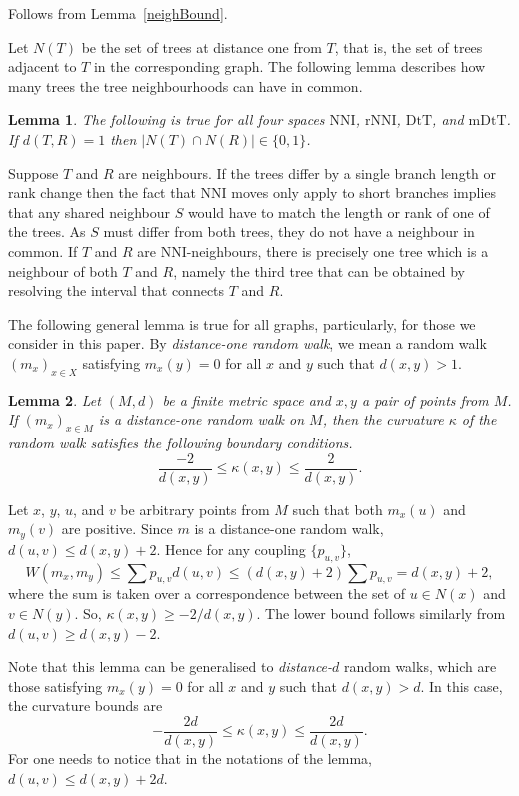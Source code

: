 \documentclass{amsart}
\newtheorem{lemma}{Lemma}
\newcommand{\dts}{\mathrm{DtT}}
\newcommand{\nni}{\mathrm{NNI}}
\newcommand{\rnni}{\mathrm{rNNI}}
\newcommand{\mdts}{\mathrm{mDtT}}
\begin{document}
\proof
Follows from Lemma~\ref{neighBound}.
\endproof

Let $N(T)$ be the set of trees at distance one from $T$, that is, the set of trees adjacent to $T$ in the corresponding graph.
The following lemma describes how many trees the tree neighbourhoods can have in common.

\begin{lemma}\label{intersecNeighb}
The following is true for all four spaces $\nni$, $\rnni$, $\dts$, and $\mdts$.
If $d(T,R) = 1$ then $|N(T)\cap N(R)|\in\{0,1\}$.
\end{lemma}

\proof
Suppose $T$ and $R$ are neighbours.
If the trees differ by a single branch length or rank change then the fact that NNI moves only apply to short branches implies that any shared neighbour $S$ would have to match the length or rank of one of the trees. As $S$ must differ from both trees, they do not have a neighbour in common.
If $T$ and $R$ are NNI-neighbours, there is precisely one tree which is a neighbour of both $T$ and $R$, namely the third tree that can be obtained by resolving the interval that connects $T$ and $R$.
\endproof

The following general lemma is true for all graphs, particularly, for those we consider in this paper.
By {\em distance-one random walk}, we mean a random walk $(m_x)_{x \in X}$ satisfying $m_x(y) = 0$ for all $x$ and $y$ such that $d(x,y) > 1$.

\begin{lemma}\label{curvBoundGeneral}
Let $(M,d)$ be a finite metric space and $x,y$ a pair of points from $M$. If
$(m_x)_{x \in M}$ is a distance-one random walk on $M$, then the curvature
$\kappa$ of the random walk satisfies the following boundary conditions.
\[
\dfrac{-2}{d(x,y)} \leq \kappa(x,y) \leq \dfrac{2}{d(x,y)}.
\]
\end{lemma}

\proof
Let $x$, $y$, $u$, and $v$ be arbitrary points from $M$ such that both $m_x(u)$
and $m_y(v)$ are positive. Since $m$ is a distance-one random walk,
$d(u,v) \leq d(x,y) + 2$. Hence for any coupling $\{p_{u,v}\}$,
\[
W(m_x,m_y) \leq \sum p_{u,v} d(u,v) \leq (d(x,y)+2)\sum p_{u,v} = d(x,y) + 2,
\]
where the sum is taken over a correspondence between the set of $u \in N(x)$ and
$v \in N(y)$. So, $\kappa(x,y) \geq - 2/d(x,y)$. The lower bound follows
similarly from $d(u,v) \geq d(x,y) - 2$.
\endproof

Note that this lemma can be generalised to {\em distance-$d$} random walks,
which are those satisfying $m_x(y) = 0$ for all $x$ and $y$ such that
$d(x,y) > d$. In this case, the curvature bounds are
\[
-\dfrac{2d}{d(x,y)} \leq \kappa(x,y) \leq \dfrac{2d}{d(x,y)}.
\]
For one needs to notice that in the notations of the lemma,
$d(u,v) \leq d(x,y) + 2d$.
\end{document}
